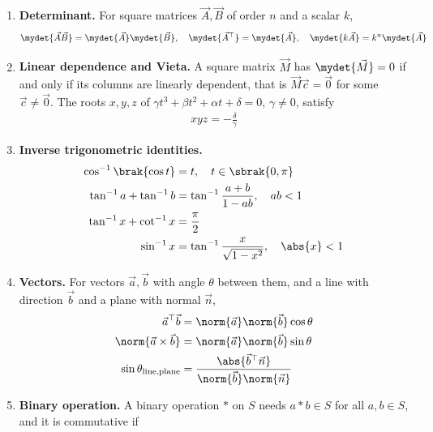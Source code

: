 \begin{enumerate}[label=\thesubsection.\arabic*, ref=\thesubsection.\theenumi, itemsep=0pt]
\item \textbf{Determinant.} For square matrices $\vec{A}, \vec{B}$ of order $n$ and a scalar $k$,
\begin{align}
\mydet{\vec{A}\vec{B}} = \mydet{\vec{A}}\mydet{\vec{B}}, \quad
\mydet{\vec{A}^{\top}} = \mydet{\vec{A}}, \quad
\mydet{k\vec{A}} = k^n\mydet{\vec{A}}
\label{eq:EE26BTECH11225-det}
\end{align}
\item \textbf{Linear dependence and Vieta.} A square matrix $\vec{M}$ has $\mydet{\vec{M}} = 0$ if and only if its columns are linearly dependent, that is $\vec{M}\vec{c} = \vec{0}$ for some $\vec{c} \neq \vec{0}$. The roots $x, y, z$ of $\gamma t^3 + \beta t^2 + \alpha t + \delta = 0$, $\gamma \neq 0$, satisfy
\begin{align}
xyz = -\frac{\delta}{\gamma}
\label{eq:EE26BTECH11225-vieta}
\end{align}
\item \textbf{Inverse trigonometric identities.}
\begin{align}
\cos^{-1}\brak{\cos t} &= t, \quad t \in \sbrak{0, \pi}
\label{eq:EE26BTECH11225-invtrig-1} \\
\tan^{-1}a + \tan^{-1}b &= \tan^{-1}\frac{a + b}{1 - ab}, \quad ab < 1
\label{eq:EE26BTECH11225-invtrig-2} \\
\tan^{-1}x + \cot^{-1}x &= \frac{\pi}{2}
\label{eq:EE26BTECH11225-invtrig-3} \\
\sin^{-1}x &= \tan^{-1}\frac{x}{\sqrt{1 - x^2}}, \quad \abs{x} < 1
\label{eq:EE26BTECH11225-invtrig-4}
\end{align}
\item \textbf{Vectors.} For vectors $\vec{a}, \vec{b}$ with angle $\theta$ between them, and a line with direction $\vec{b}$ and a plane with normal $\vec{n}$,
\begin{align}
\vec{a}^{\top}\vec{b} &= \norm{\vec{a}}\norm{\vec{b}}\cos\theta
\label{eq:EE26BTECH11225-dot} \\
\norm{\vec{a} \times \vec{b}} &= \norm{\vec{a}}\norm{\vec{b}}\sin\theta
\label{eq:EE26BTECH11225-cross} \\
\sin\theta_{\text{line,plane}} &= \frac{\abs{\vec{b}^{\top}\vec{n}}}{\norm{\vec{b}}\norm{\vec{n}}}
\label{eq:EE26BTECH11225-lineplane}
\end{align}
\item \textbf{Binary operation.} A binary operation $*$ on $S$ needs $a * b \in S$ for all $a, b \in S$, and it is commutative if

\end{enumerate}
